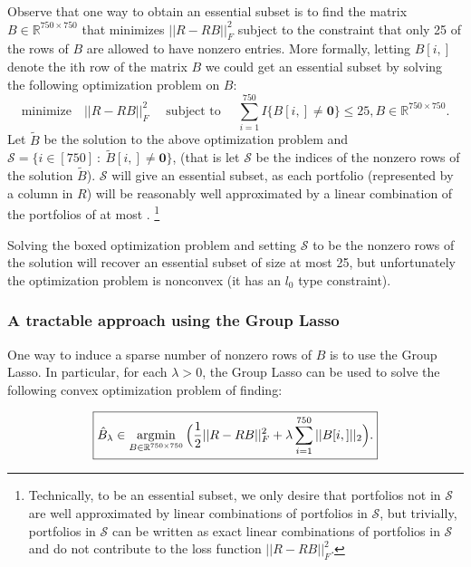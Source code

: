Observe that one way to obtain an essential subset is to find the matrix $B \in \mathbb{R}^{750 \times 750}$ that minimizes $\vert \vert R - R B \vert \vert_{F}^2$ subject to the constraint that only 25 of the rows of $B$ are allowed to have nonzero entries. More formally, letting $B[i,]$ denote the ith row of the matrix $B$ we could get an essential subset by solving the following optimization problem on $B$: $$\boxed{\text{minimize} \quad \vert \vert R - R B \vert \vert_{F}^2 \quad \text{ subject to } \quad \sum_{i=1}^{750} I \{ B[i,] \neq \mathbf{0} \} \leq 25 , B \in  \mathbb{R}^{750 \times 750} }.$$ Let $\tilde{B}$ be the solution to the above optimization problem and $\mathcal{S} = \{ i \in [750] \ : \ \tilde{B}[i,] \neq \mathbf{0} \}$, (that is let $\mathcal{S}$ be the indices of the nonzero rows of the solution $\tilde{B}$).   $\mathcal{S}$ will give an essential subset, as each portfolio (represented by a column in $R$) will be reasonably well approximated by a linear combination of the portfolios of at most . \footnote{Technically, to be an essential subset, we only desire that portfolios not in $\mathcal{S}$ are well approximated by linear combinations of portfolios in $\mathcal{S}$, but trivially, portfolios in $\mathcal{S}$ can be written as exact linear combinations of portfolios in $\mathcal{S}$ and do not contribute to the loss function $\vert \vert R - R B \vert \vert_{F}^2$.}  \newline

Solving the boxed optimization problem and setting $\mathcal{S}$ to be the nonzero rows of the solution will recover an essential subset of size at most 25, but unfortunately the optimization problem is nonconvex (it has an $l_0$ type constraint).


\subsubsection*{A tractable approach using the Group Lasso}


One way to induce a sparse number of nonzero rows of $B$ is to use the Group Lasso. In particular, for each $\lambda>0$, the Group Lasso can be used to solve the following convex optimization problem of finding:

$$\boxed{\hat{B}_{\lambda} \in \operatorname*{argmin}_{B \in \mathbb{R}^{750 \times 750}} \Big( \frac{1}{2}  \vert \vert R - R B \vert \vert_{F}^2 + \lambda \sum_{i=1}^{750} \vert \vert B[i,] \vert \vert_2 \Big).}$$

